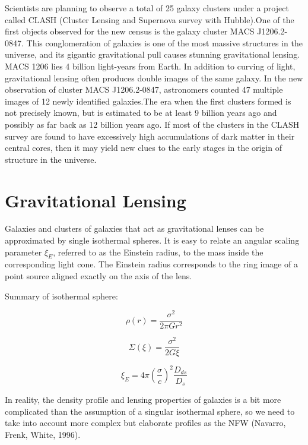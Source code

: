 Scientists are planning to observe a total of 25 galaxy clusters under a project called CLASH (Cluster Lensing and Supernova survey with Hubble).One of the first objects observed for the new census is the galaxy cluster MACS J1206.2-0847. This conglomeration of galaxies is one of the most massive structures in the universe, and its gigantic gravitational pull causes stunning gravitational lensing. MACS 1206 lies 4 billion light-years from Earth. In addition to curving of light, gravitational lensing often produces double images of the same galaxy. In the new observation of cluster MACS J1206.2-0847, astronomers counted 47 multiple images of 12 newly identified galaxies.The era when the first clusters formed is not precisely known, but is estimated to be at least 9 billion years ago and possibly as far back as 12 billion years ago. If most of the clusters in the CLASH survey are found to have excessively high accumulations of dark matter in their central cores, then it may yield new clues to the early stages in the origin of structure in the universe.


\section{Gravitational Lensing}

Galaxies and clusters of galaxies that act as gravitational lenses can be approximated by single isothermal spheres. It is easy to relate an angular scaling parameter $\xi_{E}$, referred to as the Einstein radius, to the mass inside the corresponding light cone. The Einstein radius corresponds to the ring image of a point source aligned exactly on the axis of the lens.

Summary of isothermal sphere:

\begin{equation}
\rho(r)=\frac{\sigma^2}{2\pi Gr^2}
\end{equation}

\begin{equation}
\Sigma(\xi)=\frac{\sigma^2}{2G\xi}
\end{equation}

\begin{equation}
\xi_{E}=4\pi\left(\frac{\sigma}{c}\right)^{2}\frac{D_{ds}}{D_{s}}
\end{equation}

In reality, the density profile and lensing properties of galaxies is a bit more complicated than the assumption of a singular isothermal sphere, so we need to take into account more complex but elaborate profiles as the NFW (Navarro, Frenk, White, 1996).

